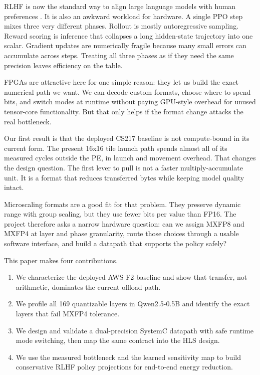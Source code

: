 \documentclass[11pt,a4paper]{article}
\begin{document}
RLHF is now the standard way to align large language models with human preferences \citep{ouyang2022training, christiano2017deep}. It is also an awkward workload for hardware. A single PPO step mixes three very different phases. Rollout is mostly autoregressive sampling. Reward scoring is inference that collapses a long hidden-state trajectory into one scalar. Gradient updates are numerically fragile because many small errors can accumulate across steps. Treating all three phases as if they need the same precision leaves efficiency on the table.

FPGAs are attractive here for one simple reason: they let us build the exact numerical path we want. We can decode custom formats, choose where to spend bits, and switch modes at runtime without paying GPU-style overhead for unused tensor-core functionality. But that only helps if the format change attacks the real bottleneck.

Our first result is that the deployed CS217 baseline is not compute-bound in its current form. The present 16x16 tile launch path spends almost all of its measured cycles outside the PE, in launch and movement overhead. That changes the design question. The first lever to pull is not a faster multiply-accumulate unit. It is a format that reduces transferred bytes while keeping model quality intact.

Microscaling formats \citep{rouhani2023mxformat} are a good fit for that problem. They preserve dynamic range with group scaling, but they use fewer bits per value than FP16. The project therefore asks a narrow hardware question: can we assign MXFP8 and MXFP4 at layer and phase granularity, route those choices through a usable software interface, and build a datapath that supports the policy safely?

This paper makes four contributions.

\begin{enumerate}    \item We characterize the deployed AWS F2 baseline and show that transfer, not arithmetic, dominates the current offload path.
    \item We profile all 169 quantizable layers in Qwen2.5-0.5B and identify the exact layers that fail MXFP4 tolerance.
    \item We design and validate a dual-precision SystemC datapath with safe runtime mode switching, then map the same contract into the HLS design.
    \item We use the measured bottleneck and the learned sensitivity map to build conservative RLHF policy projections for end-to-end energy reduction.
\end{enumerate}
\end{document}

